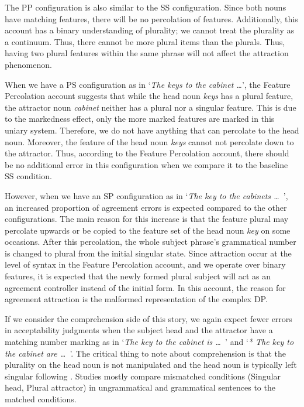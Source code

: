 The PP configuration is also similar to the SS configuration. Since both nouns have matching features, there will be no percolation of features. Additionally, this account has a binary understanding of plurality; we cannot treat the plurality as a continuum. Thus, there cannot be more plural items than the plurals. Thus, having two plural features within the same phrase will not affect the attraction phenomenon.

When we have a PS configuration as in `\emph{The keys to the cabinet \ldots}', the Feature Percolation account suggests that while the head noun \emph{keys} has a plural feature, the attractor noun \emph{cabinet} neither has a plural nor a singular feature. This is due to the markedness effect, only the more marked features are marked in this uniary system. Therefore, we do not have anything that can percolate to the head noun. Moreover, the feature of the head noun \emph{keys} cannot not percolate down to the attractor. Thus, according to the Feature Percolation account, there should be no additional error in this configuration when we compare it to the baseline SS condition.

However, when we have an SP configuration as in `\emph{The key to the cabinets \ldots{\ }}', an increased proportion of agreement errors is expected compared to the other configurations. The main reason for this increase is that the feature plural may percolate upwards or be copied to the feature set of the head noun \emph{key} on some occasions. After this percolation, the whole subject phrase's grammatical number is changed to plural from the initial singular state. Since attraction occur at the level of syntax in the Feature Percolation account, and we operate over binary features, it is expected that the newly formed plural subject will act as an agreement controller instead of the initial form. In this account, the reason for agreement attraction is the malformed representation of the complex DP. 

If we consider the comprehension side of this story, we again expect fewer errors in acceptability judgments when the subject head and the attractor have a matching number marking as in `\emph{The key to the cabinet is \ldots{\ }}' and `\emph{* The key to the cabinet are \ldots{\ }}'. The critical thing to note about comprehension is that the plurality on the head noun is not manipulated and the head noun is typically left singular following . Studies mostly compare mismatched conditions (Singular head, Plural attractor) in ungrammatical and grammatical sentences to the matched conditions.

